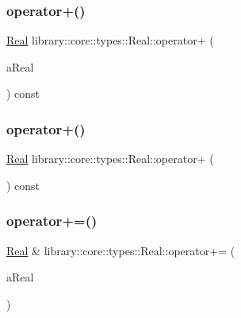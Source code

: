 \mbox{\label{classlibrary_1_1core_1_1types_1_1Real_aee62d1d76e3b0ba37dc9bebdbdcdaaf7}} 
\subsubsection{\texorpdfstring{operator+()}{operator+()}\hspace{0.1cm}{\footnotesize\ttfamily [2/3]}}
{\footnotesize\ttfamily \hyperlink{classlibrary_1_1core_1_1types_1_1Real}{Real} library\+::core\+::types\+::\+Real\+::operator+ (\begin{DoxyParamCaption}\item[{const \hyperlink{classlibrary_1_1core_1_1types_1_1Real_a9c5c8826b7e5a8e39544d23fea6c0e1c}{Real\+::\+Value\+Type} \&}]{a\+Real }\end{DoxyParamCaption}) const}

\mbox{\label{classlibrary_1_1core_1_1types_1_1Real_a7f39b72df1d66f354dce558a99dc2da5}} 
\subsubsection{\texorpdfstring{operator+()}{operator+()}\hspace{0.1cm}{\footnotesize\ttfamily [3/3]}}
{\footnotesize\ttfamily \hyperlink{classlibrary_1_1core_1_1types_1_1Real}{Real} library\+::core\+::types\+::\+Real\+::operator+ (\begin{DoxyParamCaption}{ }\end{DoxyParamCaption}) const}

\mbox{\label{classlibrary_1_1core_1_1types_1_1Real_a9d6119549877717ef91876e1e53c78f9}} 
\subsubsection{\texorpdfstring{operator+=()}{operator+=()}\hspace{0.1cm}{\footnotesize\ttfamily [1/2]}}
{\footnotesize\ttfamily \hyperlink{classlibrary_1_1core_1_1types_1_1Real}{Real} \& library\+::core\+::types\+::\+Real\+::operator+= (\begin{DoxyParamCaption}\item[{const \hyperlink{classlibrary_1_1core_1_1types_1_1Real}{Real} \&}]{a\+Real }\end{DoxyParamCaption})}

